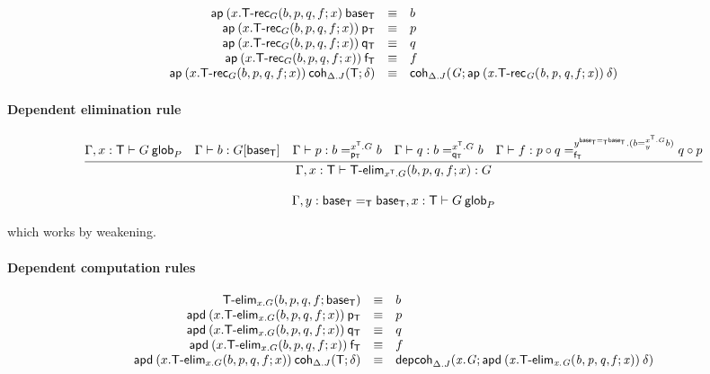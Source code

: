 \begin{small}
  \[
  \begin{array}{rcl}
    \ap{(x.\dsd{T\text{-}rec}_G(b, p, q, f; x)}{\baseT} & \equiv & b\\
    \ap{(x.\dsd{T\text{-}rec}_G(b, p, q, f; x))}{\pT} & \equiv & p\\
    \ap{(x.\dsd{T\text{-}rec}_G(b, p, q, f; x))}{\qT} & \equiv & q\\
    \ap{(x.\dsd{T\text{-}rec}_G(b, p, q, f; x))}{\fT} & \equiv & f\\
    \ap{(x.\dsd{T\text{-}rec}_G(b, p, q, f; x))}
    {\coh{\Delta.J}{\dsd{T}}{\delta}} & \equiv &
    \coh{\Delta.J}G{\ap{(x.\dsd{T\text{-}rec}_G(b, p, q, f; x))}{\delta}}
  \end{array}
  \]
\end{small}

\paragraph{Dependent elimination rule}

\begin{small}
  \[
  \infer{\ofglob{\Gamma,x:\dsd{T}}{\dsd{T\text{-}elim}_{x^\dsd{T}.G}
      (b, p, q, f; x)}{G}}
  {\wfglob{\Gamma,x:\dsd{T}}{G}{m}{P}
    & \ofglob{\Gamma}{b}{G[\baseT]}
    & \ofglob{\Gamma}{p}{\dhomj{x^{\dsd{T}}.G}{b}{b}{\pT}}
    & \ofglob{\Gamma}{q}{\dhomj{x^{\dsd{T}}.G}{b}{b}{\qT}}
    & \ofglob{\Gamma}{f}{\dhomj{y^{\homj{\dsd{T}}{\baseT}{\baseT}}.(\dhomj{x^{\dsd{T}}.G}{b}{b}{y})}
      {p\circ q}{q \circ p}{\fT}}}
  \]
\end{small}

\[\wfglob{\Gamma,y:\homj{\dsd{T}}{\baseT}{\baseT},x:\dsd{T}}{G}{m}{P}\]

which works by weakening.


\paragraph{Dependent computation rules}

\[
\begin{array}{rcl}
\dsd{T\text{-}elim}_{x.G}(b, p, q, f; \baseT) & \equiv & b \\
\apd{(x.\dsd{T\text{-}elim}_{x.G}(b, p, q, f; x))}{\pT} & \equiv & p\\
\apd{(x.\dsd{T\text{-}elim}_{x.G}(b, p, q, f; x))}{\qT} & \equiv & q\\
\apd{(x.\dsd{T\text{-}elim}_{x.G}(b, p, q, f; x))}{\fT} & \equiv & f\\
\apd{(x.\dsd{T\text{-}elim}_{x.G}(b, p, q, f; x))}
{\coh{\Delta.J}{\dsd{T}}{\delta}} & \equiv &
\depcoh{\Delta.J}{x.G}{\apd{(x.\dsd{T\text{-}elim}_{x.G}(b, p, q, f; x))}
  {\delta}}
\end{array}
\]


